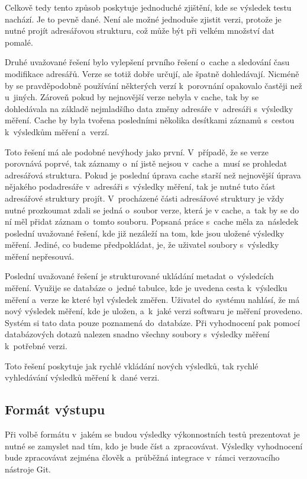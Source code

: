 Celkově tedy tento způsob poskytuje jednoduché zjištění, kde se výsledek testu nachází. Je to pevně dané. Není ale možné jednoduše
zjistit verzi, protože je nutné projít adresářovou strukturu, což může být při velkém množství dat pomalé.

Druhé uvažované řešení bylo vylepšení prvního řešení o~cache a sledování času modifikace adresářů. Verze se totiž dobře určují,
ale špatně dohledávají. Nicméně by se pravděpodobně používání některých verzí k~porovnání opakovalo častěji než u~jiných.
Zároveň pokud by nejnovější verze nebyla v cache, tak by se dohledávala na základě nejmladšího data změny adresáře
v~adresáři s~výsledky měření. Cache by byla tvořena posledními několika desítkami záznamů s~cestou k~výsledkům měření a~verzí.

Toto řešení má ale podobné nevýhody jako první. V~případě, že se verze porovnává poprvé, tak záznamy o~ní jistě nejsou v~cache
a~musí se prohledat adresářová struktura. Pokud je poslední úprava cache starší než nejnovější úprava nějakého podadresáře v~adresáři
s~výsledky měření, tak je nutné tuto část adresářové struktury projít. V~procházené části adresářové struktury je vždy nutné prozkoumat
zdali se jedná o~soubor verze, která je v cache, a~tak by se do ní měl přidat záznam o~tomto souboru. Popsaná práce s~cache měla
za~následek poslední uvažované řešení, kde již nezáleží na tom, kde jsou uložené výsledky měření. Jediné, co budeme předpokládat, je,
že uživatel soubory s~výsledky měření nepřesouvá.

Poslední uvažované řešení je strukturované ukládání metadat o~výsledcích měření. Využije se databáze o~jedné tabulce, kde
je uvedena cesta k~výsledku měření a~verze ke které byl výsledek změřen. Uživatel do~systému nahlásí, že má nový výsledek
měření, kde je uložen, a~k~jaké verzi softwaru je měření provedeno. Systém si tato data pouze poznamená do~databáze. Při
vyhodnocení pak pomocí databázových dotazů nalezen snadno všechny soubory s~výsledky měření k~potřebné verzi.

Toto řešení poskytuje jak rychlé vkládání nových výsledků, tak rychlé vyhledávání výsledků měření k~dané verzi.

\subsection{Formát výstupu}

Při volbě formátu v~jakém se budou výsledky výkonnostních testů prezentovat je nutné se zamyslet nad tím, kdo je bude číst a~zpracovávat.
Výsledky vyhodnocení bude zpracovávat zejména člověk a~průběžná integrace v~rámci verzovacího nástroje Git.


